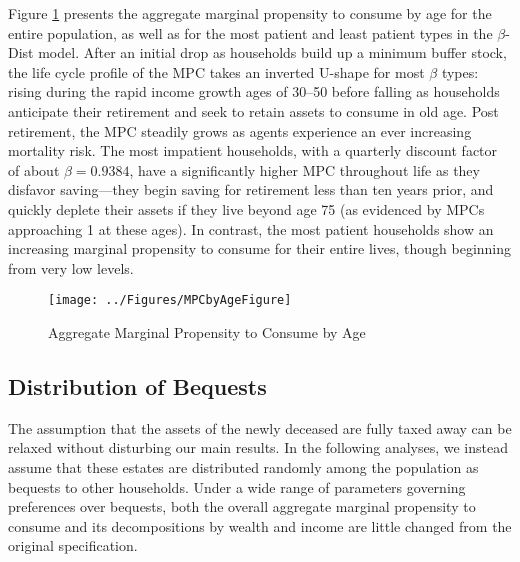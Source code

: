 \documentclass{econtex}\usepackage{graphicx} \usepackage{hyperref} \usepackage{ushort}
\newcommand{\Discount}{\ensuremath{\beta}}
\begin{document}
Figure \ref{fig:MPCbyAge} presents the aggregate marginal propensity to consume by age for the entire population, as well as for the most patient and least patient types in the $\Discount$-Dist model.  After an initial drop as households build up a minimum buffer stock, the life cycle profile of the MPC takes an inverted U-shape for most $\Discount$ types: rising during the rapid income growth ages of 30--50 before falling as households anticipate their retirement and seek to retain assets to consume in old age.  Post retirement, the MPC steadily grows as agents experience an ever increasing mortality risk.  The most impatient households, with a quarterly discount factor of about $\beta = 0.9384$, have a significantly higher MPC throughout life as they disfavor saving---they begin saving for retirement less than ten years prior, and quickly deplete their assets if they live beyond age 75 (as evidenced by MPCs approaching 1 at these ages).  In contrast, the most patient households show an increasing marginal propensity to consume for their entire lives, though beginning from very low levels.

\begin{figure}
\caption{Aggregate Marginal Propensity to Consume by Age}
\label{fig:MPCbyAge}
\begin{center}
\texttt{[image: ../Figures/MPCbyAgeFigure]}
\end{center}
\end{figure}

\subsection{Distribution of Bequests}

The assumption that the assets of the newly deceased are fully taxed away can be relaxed without disturbing our main results.  In the following analyses, we instead assume that these estates are distributed randomly among the population as bequests to other households.  Under a wide range of parameters governing preferences over bequests, both the overall aggregate marginal propensity to consume and its decompositions by wealth and income are little changed from the original specification.
\end{document}

